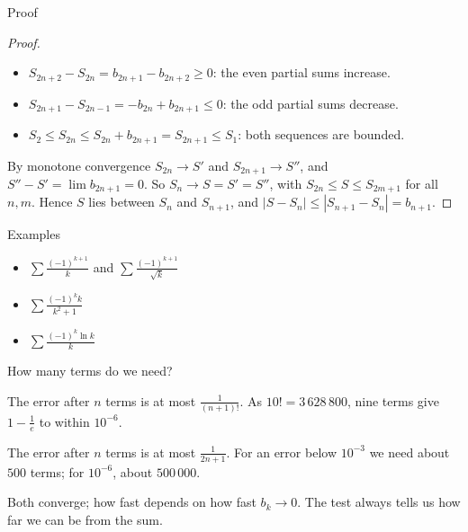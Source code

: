 \documentclass[10pt]{wosm-slides}
\begin{document}
\begin{frame}{Proof}
  \begin{proof}
    \begin{itemize}
      \item $S_{2n+2} - S_{2n} = b_{2n+1} - b_{2n+2} \ge 0$: the even partial sums increase.
      \item $S_{2n+1} - S_{2n-1} = -b_{2n} + b_{2n+1} \le 0$: the odd partial sums decrease.
      \item $S_2 \le S_{2n} \le S_{2n} + b_{2n+1} = S_{2n+1} \le S_1$:
        both sequences are bounded.
    \end{itemize}
    By monotone convergence $S_{2n} \to S'$ and $S_{2n+1} \to S''$, and
    $S'' - S' = \lim b_{2n+1} = 0$. So $S_n \to S = S' = S''$, with
    $S_{2n} \le S \le S_{2m+1}$ for all $n, m$.
    Hence $S$ lies between $S_n$ and $S_{n+1}$, and $|S - S_n| \le |S_{n+1} - S_n| = b_{n+1}$.
  \end{proof}
\end{frame}

\begin{frame}{Examples}
  \begin{itemize}
    \item $\displaystyle\sum \frac{(-1)^{k+1}}{k}$ and $\displaystyle\sum \frac{(-1)^{k+1}}{\sqrt k}$
    \item $\displaystyle\sum \frac{(-1)^k k}{k^2 + 1}$
    \item $\displaystyle\sum \frac{(-1)^k \ln k}{k}$
  \end{itemize}
\end{frame}

\begin{frame}{How many terms do we need?}
  \begin{example}[$\sum_{k=1}^\infty \frac{(-1)^{k+1}}{k!} = 1 - \frac1e$ \ (Unit 5)]
    The error after $n$ terms is at most $\frac{1}{(n+1)!}$. As $10! = 3\,628\,800$,
    nine terms give $1 - \frac1e$ to within $10^{-6}$.
  \end{example}
  \pause
  \begin{example}[$1 - \frac13 + \frac15 - \frac17 + \cdots = \frac{\pi}{4}$ \ (Unit 6)]
    The error after $n$ terms is at most $\frac{1}{2n+1}$. For an error below $10^{-3}$
    we need about $500$ terms; for $10^{-6}$, about $500\,000$.
  \end{example}
  \pause
  Both converge; how fast depends on how fast $b_k \to 0$.
  The test always tells us how far we can be from the sum.
\end{frame}
\end{document}
